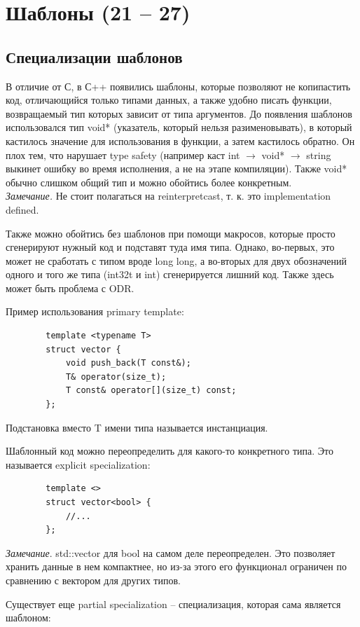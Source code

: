 \documentclass[12pt, a4paper]{article}
\begin{document}
	\section{Шаблоны (21 -- 27)}
	\subsection{Специализации шаблонов}
	В отличие от С, в С++ появились шаблоны, которые позволяют не копипастить код, отличающийся только типами данных, а также удобно писать функции, возвращаемый тип которых зависит от типа аргументов. До появления шаблонов использовался тип void* (указатель, который нельзя разименовывать), в который кастилось значение для использования в функции, а затем кастилось обратно. Он плох тем, что нарушает type safety (например каст int $\rightarrow$ void* $\rightarrow$ string выкинет ошибку во время исполнения, а не на этапе компиляции). Также void* обычно слишком общий тип и можно обойтись более конкретным.\\
	\textit{Замечание.} Не стоит полагаться на reinterpret\textunderscore cast, т. к. это implementation defined.\par
	Также можно обойтись без шаблонов при помощи макросов, которые просто сгенерируют нужный код и подставят туда имя типа. Однако, во-первых, это может не сработать с типом вроде long long, а во-вторых для двух обозначений одного и того же типа (int32\textunderscore t и int) сгенерируется лишний код. Также здесь может быть проблема с ODR.\\\par
	Пример использования primary template:
	\begin{verbatim}
		template <typename T>
		struct vector {
			void push_back(T const&);
			T& operator(size_t);
			T const& operator[](size_t) const;
		};
	\end{verbatim}
	Подстановка вместо T имени типа называется инстанциация.\\\par 
	Шаблонный код можно переопределить для какого-то конкретного типа. Это называется explicit specialization:
	\begin{verbatim}
		template <>
		struct vector<bool> {
			//...
		};
	\end{verbatim}
	\textit{Замечание}. std::vector для bool на самом деле переопределен. Это позволяет хранить данные в нем компактнее, но из-за этого его функционал ограничен по сравнению с вектором для других типов.
	\\\par Существует еще partial specialization -- специализация, которая сама является шаблоном:
\end{document}
